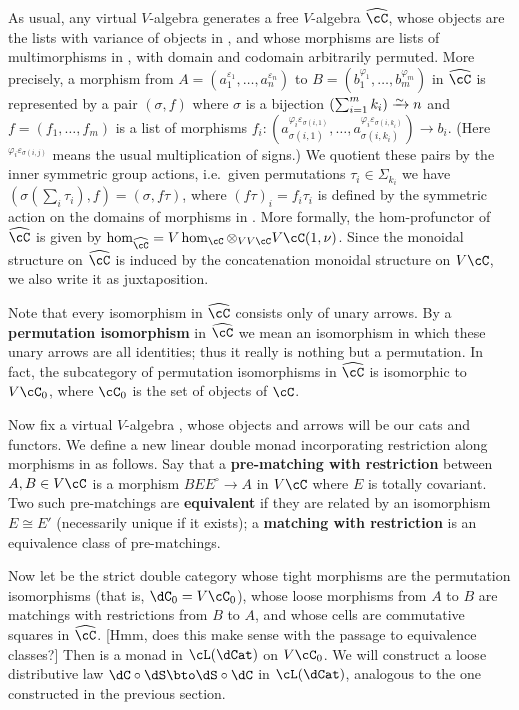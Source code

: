\documentclass{amsart}
\let\oc\circ
\newcommand{\C}{\cC}
\renewcommand{\Chat}{\ensuremath{\widehat{\C}}\xspace}
\newcommand{\Tmult}{\nu}
\renewcommand{\o}{^{\circ}}
\newcommand{\e}[1][]{^{\varepsilon_{#1}}}
\renewcommand{\ph}[1][]{^{\varphi_{#1}}}
\newcommand{\phe}[2]{^{\varphi_{#1}\varepsilon_{#2}}}
\begin{document}
As usual, any virtual $V$-algebra \C generates a free $V$-algebra \Chat, whose objects are the lists with variance of objects in \C, and whose morphisms are lists of multimorphisms in \C, with domain and codomain arbitrarily permuted.
More precisely, a morphism from $A=(a_1\e[1],\dots,a_n\e[n])$ to $B=(b_1\ph[1],\dots,b_m\ph[m])$ in \Chat is represented by a pair $(\sigma,f)$ where $\sigma$ is a bijection $\left(\sum_{i=1}^m k_i\right) \toiso n$ and $f=(f_1,\dots,f_m)$ is a list of morphisms $f_i:(a_{\sigma(i,1)}\phe{i}{\sigma(i,1)},\dots,a_{\sigma(i,k_i)}\phe{i}{\sigma(i,k_i)}) \to b_i$.
(Here $\phe{i}{\sigma(i,j)}$ means the usual multiplication of signs.)
We quotient these pairs by the inner symmetric group actions, i.e.\ given permutations $\tau_i\in\Sigma_{k_i}$ we have $(\sigma(\sum_i \tau_i), f) = (\sigma,f\tau)$, where $(f\tau)_i = f_i \tau_i$ is defined by the symmetric action on the domains of morphisms in \C.
More formally, the hom-profunctor of \Chat is given by $\hom_{\Chat} = V\hom_\C \otimes_{VV\C} V\C(1,\Tmult)$.
Since the monoidal structure on \Chat is induced by the concatenation monoidal structure on $V\C$, we also write it as juxtaposition.

Note that every isomorphism in \Chat consists only of unary arrows.
By a \textbf{permutation isomorphism} in \Chat we mean an isomorphism in which these unary arrows are all identities; thus it really is nothing but a permutation.
In fact, the subcategory of permutation isomorphisms in $\Chat$ is isomorphic to $V\C_0$, where $\C_0$ is the set of objects of $\C$.

Now fix a virtual $V$-algebra \C, whose objects and arrows will be our cats and functors.
We define a new linear double monad incorporating restriction along morphisms in \C as follows.
Say that a \textbf{pre-matching with restriction} between $A,B\in V\C$ is a morphism $B E E\o \to A$ in $V\C$ where $E$ is totally covariant.
Two such pre-matchings are \textbf{equivalent} if they are related by an isomorphism $E\cong E'$ (necessarily unique if it exists); a \textbf{matching with restriction} is an equivalence class of pre-matchings.

Now let \dC be the strict double category whose tight morphisms are the permutation isomorphisms (that is, $\dC_0 = V\C_0$), whose loose morphisms from $A$ to $B$ are matchings with restrictions from $B$ to $A$, and whose cells are commutative squares in $\Chat$.
[Hmm, does this make sense with the passage to equivalence classes?]
Then \dC is a monad in $\cL(\dCat)$ on $V\C_0$.
We will construct a loose distributive law $\dC \oc \dS \bto \dS\oc \dC$ in $\cL(\dCat)$, analogous to the one constructed in the previous section.
\end{document}
